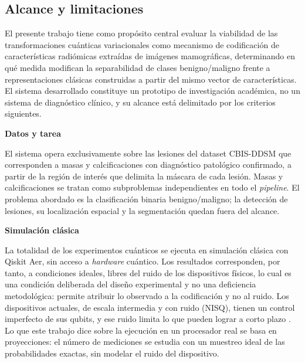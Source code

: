 
\subsection{Alcance y limitaciones}
\label{sec:alcance}

El presente trabajo tiene como propósito central evaluar la viabilidad de las transformaciones
cuánticas variacionales como mecanismo de codificación de características radiómicas extraídas de
imágenes mamográficas, determinando en qué medida modifican la separabilidad de clases
benigno/maligno frente a representaciones clásicas construidas a partir del mismo vector de
características. El sistema desarrollado constituye un prototipo de investigación académica, no un
sistema de diagnóstico clínico, y su alcance está delimitado por los criterios siguientes.

\textbf{Datos y tarea}

El sistema opera exclusivamente sobre las lesiones del dataset CBIS-DDSM que corresponden a masas y
calcificaciones con diagnóstico patológico confirmado, a partir de la región de interés que delimita
la máscara de cada lesión. Masas y calcificaciones se tratan como subproblemas independientes en
todo el \textit{pipeline}. El problema abordado es la clasificación binaria benigno/maligno; la
detección de lesiones, su localización espacial y la segmentación quedan fuera del alcance.

\textbf{Simulación clásica}

La totalidad de los experimentos cuánticos se ejecuta en simulación clásica con Qiskit Aer, sin
acceso a \textit{hardware} cuántico. Los resultados corresponden, por tanto, a condiciones ideales,
libres del ruido de los dispositivos físicos, lo cual es una condición deliberada del diseño
experimental y no una deficiencia metodológica: permite atribuir lo observado a la codificación y no
al ruido. Los dispositivos actuales, de escala intermedia y con ruido (NISQ), tienen un control
imperfecto de sus qubits, y ese ruido limita lo que pueden lograr a corto plazo
\cite{Preskill2018NISQ}. Lo que este trabajo dice sobre la ejecución en un procesador real se basa en
proyecciones: el número de mediciones se estudia con un muestreo ideal de las probabilidades
exactas, sin modelar el ruido del dispositivo.

